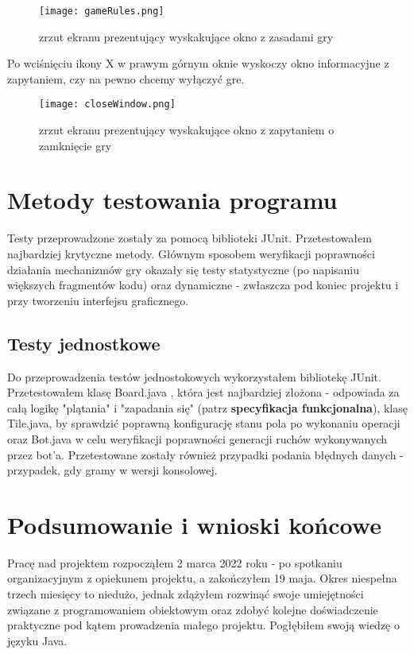 \documentclass{article}
\begin{document}
\begin{figure}[H]
\centering
\texttt{[image: gameRules.png]}\\
\caption{zrzut ekranu prezentujący wyskakujące okno z zasadami gry}
\end{figure}

\newpage
Po wciśnięciu ikony X w prawym górnym oknie wyskoczy okno informacyjne z zapytaniem, czy na pewno chcemy wyłączyć gre.

\begin{figure}[H]
\centering
\texttt{[image: closeWindow.png]}\\
\caption{zrzut ekranu prezentujący wyskakujące okno z zapytaniem o zamknięcie gry}
\end{figure}

\section{Metody testowania programu}
Testy przeprowadzone zostały za pomocą biblioteki JUnit. Przetestowałem najbardziej krytyczne metody. Głównym sposobem weryfikacji poprawności działania mechanizmów gry okazały się testy statystyczne (po napisaniu większych fragmentów kodu) oraz dynamiczne - zwłaszcza pod koniec projektu i przy tworzeniu interfejsu graficznego. 

\subsection{Testy jednostkowe}
Do przeprowadzenia testów jednostokowych  wykorzystałem bibliotekę JUnit. Przetestowałem klasę Board.java , która jest najbardziej złożona - odpowiada za całą logikę "plątania" i "zapadania się" (patrz \textbf{specyfikacja funkcjonalna}), klasę Tile.java, by sprawdzić poprawną konfigurację stanu pola po wykonaniu operacji oraz Bot.java w celu weryfikacji poprawności generacji ruchów wykonywanych przez bot'a.
Przetestowane zostały również przypadki podania błędnych danych - przypadek, gdy gramy w wersji konsolowej.

\newpage
\section{Podsumowanie i wnioski końcowe}
Pracę nad projektem rozpocząłem 2 marca 2022 roku - po spotkaniu organizacyjnym z opiekunem projektu, a zakończyłem 19 maja. Okres niespełna trzech miesięcy to niedużo, jednak zdążyłem rozwinąć swoje umiejętności związane z programowaniem obiektowym oraz zdobyć kolejne doświadczenie praktyczne pod kątem prowadzenia małego projektu. Pogłębiłem swoją wiedzę o języku Java.
\end{document}
